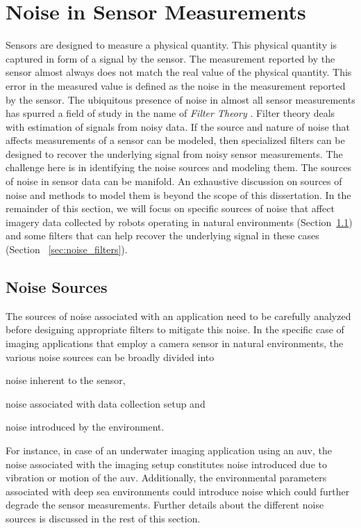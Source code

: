 \section{Noise in Sensor Measurements}

Sensors are designed to measure a physical quantity. This physical quantity is captured in form of a signal by the sensor.
The measurement reported by the sensor almost always does not match the real value of the physical quantity.
This error in the measured value is defined as the noise in the measurement reported by the sensor.
The ubiquitous presence of noise in almost all sensor measurements has spurred a field of study in the name of 
\emph{Filter Theory} \cite{haykin}. Filter theory deals with estimation of signals from noisy data. 
If the source and nature of noise that affects measurements of a sensor can be modeled, then specialized
filters can be designed to recover the underlying signal from noisy sensor measurements.
The challenge here is in identifying the noise sources and modeling them. 
The sources of noise in sensor data can be manifold. An exhaustive discussion on sources of noise and methods to model them
is beyond the scope of this dissertation. In the remainder of this section, we will focus on specific sources of noise that affect 
imagery data collected by robots operating in natural environments (Section~\ref{sec:noise_sources}) and some filters that can 
help recover the underlying signal in these cases (Section ~\ref{sec:noise_filters}).

\subsection{Noise Sources}
\label{sec:noise_sources}

The sources of noise associated with an application need to be carefully analyzed before designing appropriate filters to mitigate this noise.
In the specific case of imaging applications that employ a camera sensor in natural environments, the various noise sources can be broadly divided
into \begin{enumerate*}[label=(\roman*)] \item noise inherent to the sensor, \item noise associated with data collection setup and \item noise introduced by the environment. \end{enumerate*} For instance, in case of an underwater imaging application using an \gls{auv}, the noise associated with the imaging setup constitutes noise introduced due to vibration or motion of the \gls{auv}. Additionally, the environmental parameters associated with deep sea environments could introduce noise which could further degrade the sensor measurements. Further details about the different noise sources is discussed in the rest of this section.

